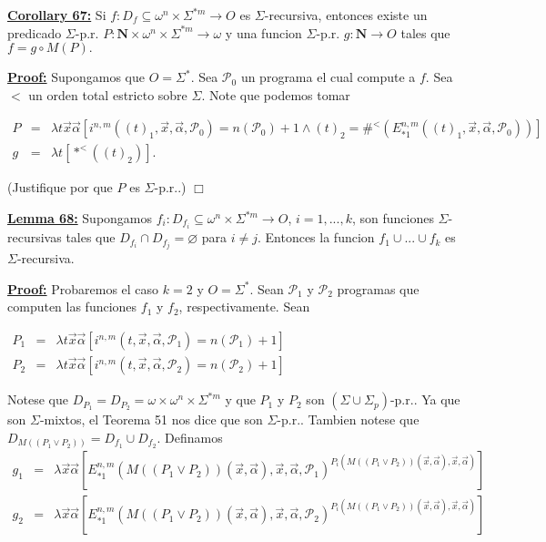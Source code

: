 \textbf{\underline{Corollary 67:}} Si \(f:D_{f}\subseteq \omega ^{n}\times \Sigma ^{\ast m}\rightarrow O\) es \( \Sigma \)-recursiva, entonces existe un predicado \(\Sigma \)-p.r. \(P:\mathbf{N} \times \omega ^{n}\times \Sigma ^{\ast m}\rightarrow \omega \) y una funcion \( \Sigma \)-p.r. \(g:\mathbf{N}\rightarrow O\) tales que \(f=g\circ M(P).\)

\textbf{\underline{Proof:}} Supongamos que \(O=\Sigma ^{\ast }\). Sea \(\mathcal{P}_{0}\) un programa el cual compute a \(f\). Sea \(< \) un orden total estricto sobre \(\Sigma \). Note que podemos tomar

\(\displaystyle \begin{array}{rcl} P & =& \lambda t\vec{x}\vec{\alpha}[i^{n,m}\left( (t)_{1},\vec{x},\vec{\alpha}, \mathcal{P}_{0}\right) =n(\mathcal{P}_{0})+1\wedge (t)_{2}=\#^{< }(E_{\ast 1}^{n,m}((t)_{1},\vec{x},\vec{\alpha},\mathcal{P}_{0}))] \\ g & =& \lambda t\left[ \ast ^{< }((t)_{2})\right] \text{.} \end{array} \)

(Justifique por que \(P\) es \(\Sigma \)-p.r..) \(\Box\)


\textbf{\underline{Lemma 68:}} Supongamos \(f_{i}:D_{f_{i}}\subseteq \omega ^{n}\times \Sigma ^{\ast m}\rightarrow O\), \(i=1,...,k\), son funciones \(\Sigma \)-recursivas tales que \(D_{f_{i}}\cap D_{f_{j}}=\varnothing \) para \(i\neq j\). Entonces la funcion \(f_{1}\cup ...\cup f_{k}\) es \(\Sigma \)-recursiva.

\textbf{\underline{Proof:}} Probaremos el caso \(k=2\) y \(O=\Sigma ^{\ast }\). Sean \(\mathcal{P}_{1}\) y \( \mathcal{P}_{2}\) programas que computen las funciones \(f_{1}\) y \(f_{2}\), respectivamente. Sean

\(\displaystyle \begin{array}{rcl} P_{1} & =& \lambda t\vec{x}\vec{\alpha}\left[ i^{n,m}(t,\vec{x},\vec{\alpha}, \mathcal{P}_{1})=n(\mathcal{P}_{1})+1\right] \\ P_{2} & =& \lambda t\vec{x}\vec{\alpha}\left[ i^{n,m}(t,\vec{x},\vec{\alpha}, \mathcal{P}_{2})=n(\mathcal{P}_{2})+1\right] \end{array} \)

Notese que \(D_{P_{1}}=D_{P_{2}}=\omega \times \omega ^{n}\times \Sigma ^{\ast m}\) y que \(P_{1}\) y \(P_{2}\) son \((\Sigma \cup \Sigma _{p})\)-p.r.. Ya que son \(\Sigma \)-mixtos, el Teorema 51 nos dice que son \( \Sigma \)-p.r.. Tambien notese que \(D_{M((P_{1}\vee P_{2}))}=D_{f_{1}}\cup D_{f_{2}}\). Definamos
\(\displaystyle \begin{array}{rcl} g_{1} & =& \lambda \vec{x}\vec{\alpha}\left[ E_{\ast 1}^{n,m}(M\left( (P_{1}\vee P_{2})\right) (\vec{x},\vec{\alpha}),\vec{x},\vec{\alpha}, \mathcal{P}_{1})^{P_{i}(M\left( (P_{1}\vee P_{2})\right) (\vec{x},\vec{\alpha }),\vec{x},\vec{\alpha})}\right] \\ g_{2} & =& \lambda \vec{x}\vec{\alpha}\left[ E_{\ast 1}^{n,m}(M\left( (P_{1}\vee P_{2})\right) (\vec{x},\vec{\alpha}),\vec{x},\vec{\alpha}, \mathcal{P}_{2})^{P_{i}(M\left( (P_{1}\vee P_{2})\right) (\vec{x},\vec{\alpha }),\vec{x},\vec{\alpha})}\right] \end{array} \)

